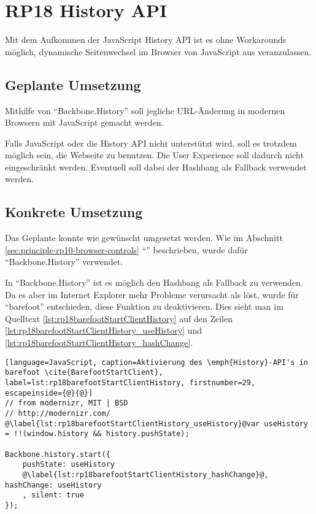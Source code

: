\section{RP18 History API}
\label{sec:principle-rp18-history-api}

Mit dem Aufkommen der JavaScript History API \cite{HistoryAPI} ist es ohne Workarounds möglich, dynamische Seitenwechsel im Browser von JavaScript aus veranzulassen.

\subsection*{Geplante Umsetzung}
Mithilfe von ``Backbone.History'' \cite{BackbonejsHistory} soll jegliche URL-Änderung in modernen Browsern mit JavaScript gemacht werden.

Falls JavaScript oder die History API nicht unterstützt wird, soll es trotzdem möglich sein, die Webseite zu benutzen. Die User Experience soll dadurch nicht eingeschränkt werden. Eventuell soll dabei der \gls{Hashbang} als Fallback verwendet werden.

\subsection*{Konkrete Umsetzung}
Das Geplante konnte wie gewünscht umgesetzt werden. Wie im Abschnitt \ref{sec:principle-rp10-browser-controls} ``'' beschrieben, wurde dafür ``Backbone.History'' verwendet.

In ``Backbone.History'' ist es möglich den Hashbang als Fallback zu verwenden. Da es aber im Internet Explorer mehr Probleme verursacht als löst, wurde für ``barefoot'' entschieden, diese Funktion zu deaktivieren. Dies sieht man im Quelltext \ref{lst:rp18barefootStartClientHistory} auf den Zeilen \ref{lst:rp18barefootStartClientHistory_useHistory} und \ref{lst:rp18barefootStartClientHistory_hashChange}.

\begin{lstlisting}[language=JavaScript, caption=Aktivierung des \emph{History}-API's in barefoot \cite{BarefootStartClient}, label=lst:rp18barefootStartClientHistory, firstnumber=29, escapeinside={@}{@}]
// from modernizr, MIT | BSD
// http://modernizr.com/
@\label{lst:rp18barefootStartClientHistory_useHistory}@var useHistory = !!(window.history && history.pushState);

Backbone.history.start({
	pushState: useHistory
	@\label{lst:rp18barefootStartClientHistory_hashChange}@, hashChange: useHistory
	, silent: true
});
\end{lstlisting}


